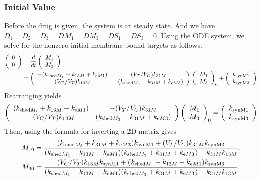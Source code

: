 \subsubsection{Initial Value}



Before the drug is given, the system is at steady state. And we have $D_1 = D_2 = D_3 = DM_1 = DM_3 = DS_1 = DS_3 = 0$. Using the ODE system, we solve for the nonzero initial membrane bound targets as follows.
\begin{align*}
\left(\begin{array}{c}
0\\
0
\end{array}\right) & = \frac{d}{dt}\left(\begin{array}{c}
M_{1}\\
M_{3}
\end{array}\right) \\
& = \left(\begin{array}{cc}
-(k_{\text{shed}M_1} + k_{13M} + k_{\text{e} M1}) & (V_{T}/V_{C})k_{31M}\\
(V_{C}/V_{T})k_{13M} & -(k_{\text{shed}M_3} + k_{31M} + k_{\text{e} M3})
\end{array}\right)\left(\begin{array}{c}
M_{1}\\
M_{3}
\end{array}\right)_{0} + \left(\begin{array}{c}
k_{\text{synM}1}\\
k_{\text{synM}3}
\end{array}\right)
\end{align*}
Rearranging yields
\begin{align*}
\left(\begin{array}{cc}
(k_{\text{shed}M_1} + k_{13M} + k_{\text{e} M1}) & -(V_{T}/V_{C})k_{31M}\\
-(V_{C}/V_{T})k_{13M}                      & (k_{\text{shed}M_3} + k_{31M} + k_{\text{e} M3})
\end{array}\right)\left(\begin{array}{c}
M_{1}\\
M_{3}
\end{array}\right)_{0} = \left(\begin{array}{c}
k_{\text{synM}1}\\
k_{\text{synM}3}
\end{array}\right)
\end{align*}
Then, using the formula for inverting a 2D matrix gives
\begin{align}
M_{10} & = \frac{(k_{\text{shed}M_3} + k_{31M} + k_{\text{e} M3})k_{\text{synM}1} + (V_{T}/V_{C})k_{31M}k_{\text{synM}3}}{(k_{\text{shed}M_1} + k_{13M} + k_{\text{e} M1})(k_{\text{shed}M_3} + k_{31M} + k_{\text{e} M3}) - k_{31M}k_{13M}}, \label{M10}\\
M_{30} & = \frac{(V_{C}/V_{T})k_{13M}k_{\text{synM}1} + (k_{\text{shed}M_1} + k_{13M} + k_{\text{e} M1})k_{\text{synM}3}}{(k_{\text{shed}M_1} + k_{13M} + k_{\text{e} M1})(k_{\text{shed}M_3} + k_{31M} + k_{\text{e} M3}) - k_{31M}k_{13M}}. \label{M30}
\end{align}
